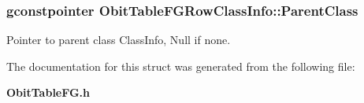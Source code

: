 \subsubsection{\setlength{\rightskip}{0pt plus 5cm}gconstpointer {\bf Obit\-Table\-FGRow\-Class\-Info::Parent\-Class}}\label{structObitTableFGRowClassInfo_o3}


Pointer to parent class Class\-Info, Null if none. 



The documentation for this struct was generated from the following file:\begin{CompactItemize}
\item 
{\bf Obit\-Table\-FG.h}\end{CompactItemize}

